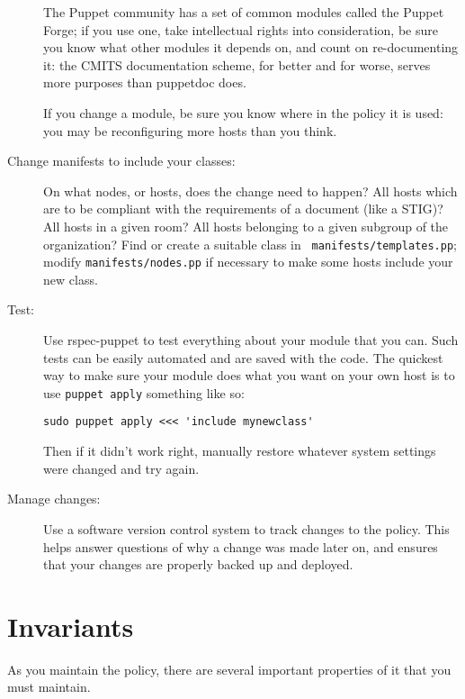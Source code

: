 \begin{description}
The Puppet community has a set of common modules called the Puppet Forge;
if you use one, take intellectual rights into consideration, be sure you
know what other modules it depends on, and count on re-documenting it: the
CMITS documentation scheme, for better and for worse, serves more purposes
than puppetdoc does.

If you change a module, be sure you know where in the policy it is used:
you may be reconfiguring more hosts than you think.

\item[Change manifests to include your classes:]
On what nodes, or hosts, does the change need to happen? All hosts which
are to be compliant with the requirements of a document (like a STIG)? All
hosts in a given room? All hosts belonging to a given subgroup of the
organization?  Find or create a suitable class in {\tt
manifests/templates.pp}; modify {\tt manifests/nodes.pp} if necessary to
make some hosts include your new class.

\item[Test:] Use \textsf{rspec-puppet} to test everything about your
  module that you can. Such tests can be easily automated and are
  saved with the code. The quickest way to make sure your module does
  what you want on your own host is to use \verb!puppet apply!
  something like so:
\begin{verbatim}
sudo puppet apply <<< 'include mynewclass'
\end{verbatim}
  Then if it didn't work right, manually restore whatever system
  settings were changed and try again.

\item[Manage changes:]
Use a software version control system to track changes to the policy. This
helps answer questions of why a change was made later on, and ensures that
your changes are properly backed up and deployed.

\end{description}




\section{Invariants}
\label{invariants}

As you maintain the policy, there are several important properties of it
that you must maintain. 

